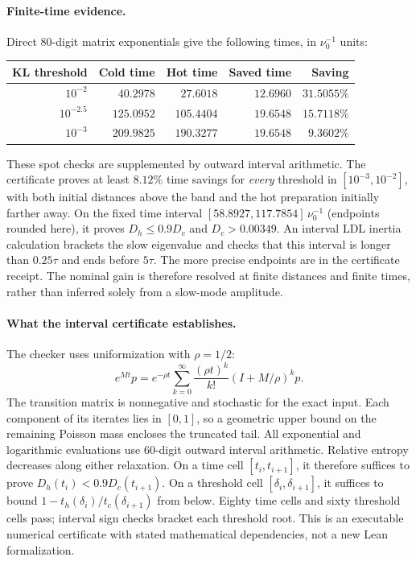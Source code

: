 \documentclass[11pt]{article}
\begin{document}
\paragraph{Finite-time evidence.}
Direct 80-digit matrix exponentials give the following times, in
$\nu_0^{-1}$ units:
\begin{center}
\begin{tabular}{rrrrr}
\toprule
KL threshold & Cold time & Hot time & Saved time & Saving\\
\midrule
$10^{-2}$ & $40.2978$ & $27.6018$ & $12.6960$ & $31.5055\%$\\
$10^{-2.5}$ & $125.0952$ & $105.4404$ & $19.6548$ & $15.7118\%$\\
$10^{-3}$ & $209.9825$ & $190.3277$ & $19.6548$ & $9.3602\%$\\
\bottomrule
\end{tabular}
\end{center}
These spot checks are supplemented by outward interval arithmetic.
The certificate proves at least $8.12\%$ time savings for
\emph{every} threshold in $[10^{-3},10^{-2}]$, with both initial
distances above the band and the hot preparation initially farther away.
On the fixed time interval $[58.8927,117.7854]\,\nu_0^{-1}$ (endpoints
rounded here), it proves $D_h\leq0.9D_c$ and $D_c>0.00349$.
An interval LDL inertia calculation brackets the slow eigenvalue and
checks that this interval is longer than $0.25\tau$ and ends before
$5\tau$. The more precise endpoints are in the certificate receipt.
The nominal gain is therefore resolved at finite distances and finite
times, rather than inferred solely from a slow-mode amplitude.

\paragraph{What the interval certificate establishes.}
The checker uses uniformization with $\rho=1/2$:
\[
 e^{Mt}p=e^{-\rho t}\sum_{k=0}^{\infty}
 \frac{(\rho t)^k}{k!}(I+M/\rho)^kp.
\]
The transition matrix is nonnegative and stochastic for the exact input.
Each component of its iterates lies in $[0,1]$, so a geometric upper bound
on the remaining Poisson mass encloses the truncated tail. All exponential
and logarithmic evaluations use 60-digit outward interval arithmetic.
Relative entropy decreases along either relaxation. On a time cell
$[t_i,t_{i+1}]$, it therefore suffices to prove
$D_h(t_i)<0.9D_c(t_{i+1})$. On a threshold cell
$[\delta_i,\delta_{i+1}]$, it suffices to bound
$1-t_h(\delta_i)/t_c(\delta_{i+1})$ from below.
Eighty time cells and sixty threshold cells pass; interval sign checks
bracket each threshold root. This is an executable numerical certificate
with stated mathematical dependencies, not a new Lean formalization.
\end{document}
